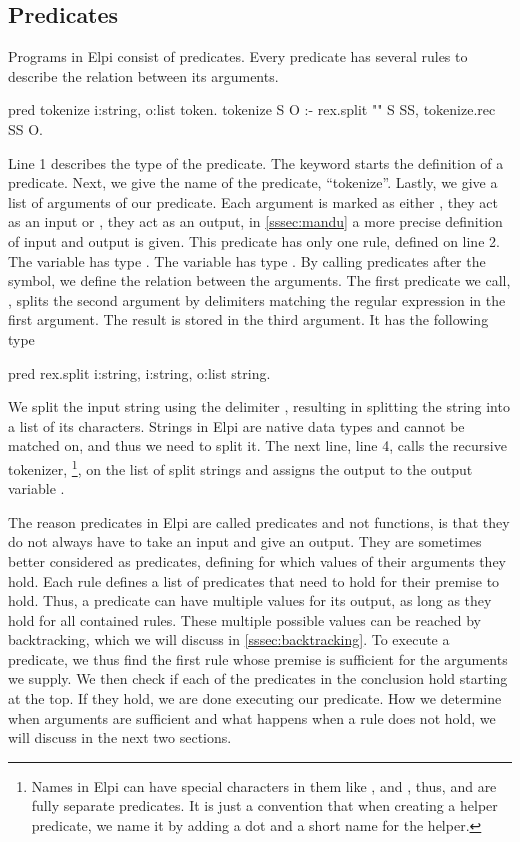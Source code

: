 \documentclass[thesis.tex]{subfiles}
\begin{document}
{{\subsection{Predicates} \label{sssec:predicates}
Programs in Elpi consist of predicates. Every predicate has several rules to describe the relation between its arguments.
\begin{elpicode}
  pred tokenize i:string, o:list token.
  tokenize S O :- 
    rex.split "" S SS,
    tokenize.rec SS O.
\end{elpicode}
Line 1 describes the type of the predicate. The keyword  starts the definition of a predicate. Next, we give the name of the predicate, ``tokenize''. Lastly, we give a list of arguments of our predicate. Each argument is marked as either , they act as an input or , they act as an output, in \cref{sssec:mandu} a more precise definition of input and output is given. This predicate has only one rule, defined on line 2. The variable  has type . The variable  has type . By calling predicates after the \elpii{:-} symbol, we define the relation between the arguments. The first predicate we call, , splits the second argument by delimiters matching the regular expression in the first argument. The result is stored in the third argument. It has the following type
\begin{elpicode}
  pred rex.split i:string, i:string, o:list string.
\end{elpicode}
We split the input string using the delimiter , resulting in splitting the string into a list of its characters. Strings in Elpi are native data types and cannot be matched on, and thus we need to split it. The next line, line 4, calls the recursive tokenizer, \footnote{Names in Elpi can have special characters in them like , \elpii{-} and \elpii{>}, thus,  and  are fully separate predicates. It is just a convention that when creating a helper predicate, we name it by adding a dot and a short name for the helper.}, on the list of split strings and assigns the output to the output variable .

The reason predicates in Elpi are called predicates and not functions, is that they do not always have to take an input and give an output. They are sometimes better considered as predicates, defining for which values of their arguments they hold. Each rule defines a list of predicates that need to hold for their premise to hold. Thus, a predicate can have multiple values for its output, as long as they hold for all contained rules. These multiple possible values can be reached by backtracking, which we will discuss in \cref{sssec:backtracking}. To execute a predicate, we thus find the first rule whose premise is sufficient for the arguments we supply. We then check if each of the predicates in the conclusion hold starting at the top. If they hold, we are done executing our predicate. How we determine when arguments are sufficient and what happens when a rule does not hold, we will discuss in the next two sections.

}}
\end{document}
